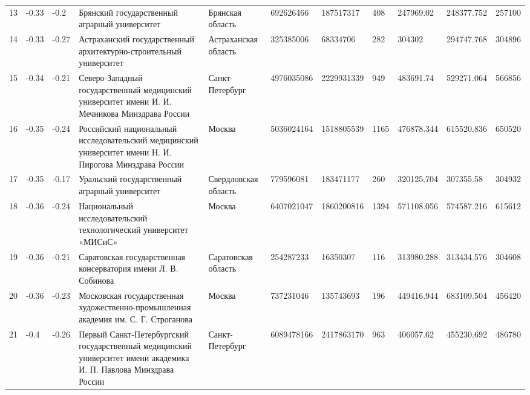 \documentclass[alpha-refs]{wiley-article-05g}
\begin{document}
\begin{table}[ht]
\begin{tabular}{rllllllllll}
		13 & -0.33 & -0.2 & Брянский государственный аграрный университет & Брянская область & 692626466 & 187517317 & 408 & 247969.02 & 248377.752 & 257100 \\ 
		14 & -0.33 & -0.27 & Астраханский государственный архитектурно-строительный университет & Астраханская область & 325385006 & 68334706 & 282 & 304302 & 294747.768 & 304896 \\ 
		15 & -0.34 & -0.21 & Северо-Западный государственный медицинский университет имени И. И. Мечникова Минздрава России & Санкт-Петербург & 4976035086 & 2229931339 & 949 & 483691.74 & 529271.064 & 566856 \\ 
		16 & -0.35 & -0.24 & Российский национальный исследовательский медицинский университет имени Н. И. Пирогова Минздрава России & Москва & 5036024164 & 1518805539 & 1165 & 476878.344 & 615520.836 & 650520 \\ 
		17 & -0.35 & -0.17 & Уральский государственный аграрный университет & Свердловская область & 779596081 & 183471177 & 260 & 320125.704 & 307355.58 & 304932 \\ 
		18 & -0.36 & -0.24 & Национальный исследовательский технологический университет «МИСиС» & Москва & 6407021047 & 1860200816 & 1394 & 571108.056 & 574587.216 & 615612 \\ 
		19 & -0.36 & -0.21 & Саратовская государственная консерватория имени Л. В. Собинова & Саратовская область & 254287233 & 16350307 & 116 & 313980.288 & 313434.576 & 304608 \\ 
		20 & -0.36 & -0.23 & Московская государственная художественно-промышленная академия им. С. Г. Строганова & Москва & 737231046 & 135743693 & 196 & 449416.944 & 683109.504 & 456420 \\ 
		21 & -0.4 & -0.26 & Первый Санкт-Петербургский государственный медицинский университет имени академика И. П. Павлова Минздрава России & Санкт-Петербург & 6089478166 & 2417863170 & 963 & 406057.62 & 455230.692 & 486780 \\ 
		\hline
	\end{tabular}
\end{table}
\end{document}
